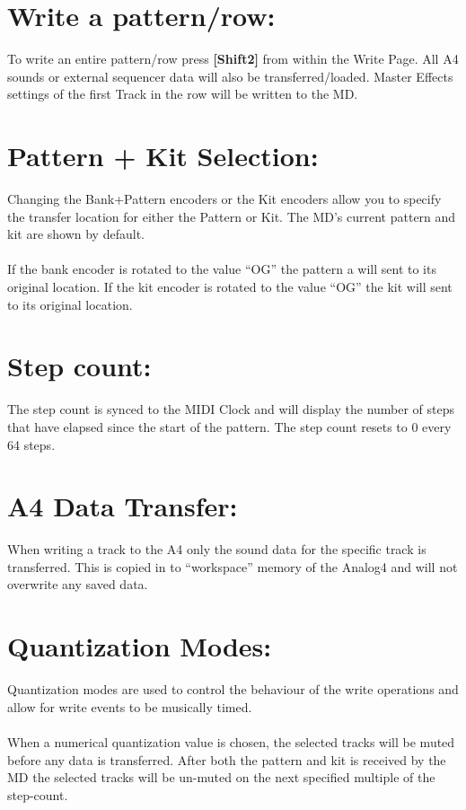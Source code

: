 \section{Write a pattern/row:}
To write an entire pattern/row press \textbf{[Shift2]} from within the Write Page.
All A4 sounds or external sequencer data will also be transferred/loaded.
Master Effects settings of the first Track in the row will be written to the MD.

\section{Pattern + Kit Selection:}
Changing the Bank+Pattern encoders or the Kit encoders allow you to specify the transfer location for either the Pattern or Kit. The MD’s current pattern and kit are shown by default.
\\
\\If the bank encoder is rotated to the value “OG” the pattern a will sent to its original location. If the kit encoder is rotated to the value “OG” the kit will sent to its original location.\\

\section{Step count:}
The step count is synced to the MIDI Clock and will display the number of steps
that have elapsed since the start of the pattern. The step count resets to 0 every 64 steps.

\section{A4 Data Transfer:}
When writing a track to the A4 only the sound data for the specific track is transferred. This is copied in to “workspace” memory of the Analog4 and will not overwrite any saved data.

\section{Quantization Modes:}
Quantization modes are used to control the behaviour of the write operations and allow for write events to be musically timed.\\
\\
When a numerical quantization value is chosen, the selected tracks will be muted before any data is transferred. After both the pattern and kit is received by the MD the selected tracks will be un-muted on the next specified multiple of the step-count.

